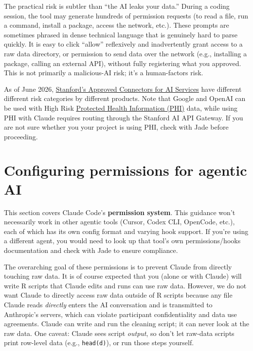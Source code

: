 \documentclass[
]{book}
\begin{document}
The practical risk is subtler than ``the AI leaks your data.'' During a coding session, the tool may generate hundreds of
permission requests (to read a file, run a command, install a package,
access the network, etc.). These prompts are sometimes phrased in dense
technical language that is genuinely hard to parse quickly. It is easy
to click ``allow'' reflexively and
inadvertently grant access to a raw data directory, or permission to
send data over the network (e.g., installing a package, calling an
external API), without fully registering what you approved. This is not primarily a malicious-AI risk; it's a human-factors risk.

As of June 2026, \href{https://uit.stanford.edu/ai/connectors}{Stanford's Approved Connectors for AI
Services} have different
different risk categories by different products. Note that Google and
OpenAI can be used with High Risk \href{https://med.stanford.edu/irt/security/stanfordinfo/hipaa.html}{Protected Health Information
(PHI)}
data, while using PHI with Claude requires routing through the Stanford
AI API Gateway. If you are not sure whether you your project is using
PHI, check with Jade before proceeding.

\section{Configuring permissions for agentic AI}\label{configuring-permissions-for-agentic-ai}

This section covers Claude Code's \textbf{permission system}. This guidance won't necessarily work in other agentic tools (Cursor, Codex CLI,
OpenCode, etc.), each of which has its own config format and varying
hook support. If you're using a different agent, you would need to look
up that tool's own permissions/hooks documentation and check with Jade to ensure compliance.

The overarching goal of these permissions is to prevent Claude from directly touching raw data. It is of course expected that you (alone or with Claude) will write R scripts that Claude edits and runs can use raw data. However, we do not want Claude to directly access raw data outside of R scripts because any file Claude reads \emph{directly} enters
the AI conversation and is transmitted to Anthropic's servers, which can violate participant confidentiality and data use agreements. Claude can
write and run the cleaning script; it can never look at the raw data.
One caveat: Claude sees script \emph{output}, so don't let raw-data
scripts print row-level data (e.g., \texttt{head(d)}), or run those steps
yourself.
\end{document}
